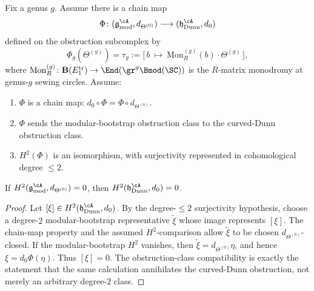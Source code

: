 \begin{theorem}
\label{thm:curved-dunn-bridge}

Fix a genus \(g\). Assume there is a chain map
\[
 \Phi\colon (\mathfrak{g}^{\cA}_{\mathrm{mod}}, d_{\Theta^{(0)}})
 \longrightarrow (\mathfrak{h}^{\cA}_{\mathrm{Dunn}}, d_0)
\]
defined on the obstruction subcomplex by
\[
 \Phi_g(\Theta^{(g)})
 = \tau_g := \bigl[\, b\ \mapsto\ \mathrm{Mon}^{(g)}_R(b) \cdot
 \Theta^{(g)}\,\bigr],
\]
where $\mathrm{Mon}^{(g)}_R\colon \mathbf{B}(E_1^{\mathrm{tr}})
\to \End(\gr^g\Bmod(\SC))$ is the $R$-matrix monodromy at
genus-$g$ sewing circles. Assume:
\begin{enumerate}[label=\textup{(\roman*)}]
\item $\Phi$ is a chain map: $d_0 \circ \Phi = \Phi \circ d_{\Theta^{(0)}}$.
\item $\Phi$ sends the modular-bootstrap obstruction class to the
 curved-Dunn obstruction class.
\item \(H^2(\Phi)\) is an isomorphism, with surjectivity represented
 in cohomological degree \(\le 2\).
\end{enumerate}
If \(H^2(\mathfrak{g}^{\cA}_{\mathrm{mod}},d_{\Theta^{(0)}})=0\),
then \(H^2(\mathfrak{h}^{\cA}_{\mathrm{Dunn}},d_0)=0\).
\end{theorem}

\begin{proof}
Let \([\xi]\in H^2(\mathfrak{h}^{\cA}_{\mathrm{Dunn}},d_0)\).
By the degree-\(\le2\) surjectivity hypothesis, choose a
degree-\(2\) modular-bootstrap representative \(\tilde\xi\) whose
image represents \([\xi]\). The chain-map property and the
assumed \(H^2\)-comparison allow \(\tilde\xi\) to be chosen
\(d_{\Theta^{(0)}}\)-closed. If the modular-bootstrap \(H^2\)
vanishes, then \(\tilde\xi=d_{\Theta^{(0)}}\eta\), and hence
\(\xi=d_0\Phi(\eta)\). Thus \([\xi]=0\). The obstruction-class
compatibility is exactly the statement that the same calculation
annihilates the curved-Dunn obstruction, not merely an arbitrary
degree-\(2\) class.
\end{proof}

